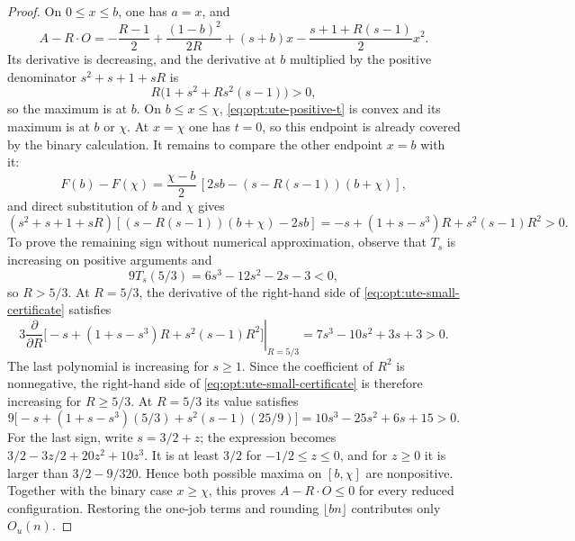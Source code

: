 \begin{proof}
On $0\le x\le b$, one has $a=x$, and
\begin{equation}
 A-R\cdot O=-\frac{R-1}{2}+\frac{(1-b)^2}{2R}+(s+b)x
 -\frac{s+1+R(s-1)}2x^2.
 \label{eq:opt:ute-small-x}
\end{equation}
Its derivative is decreasing, and the derivative at $b$ multiplied by the
positive denominator $s^2+s+1+sR$ is
\begin{equation}
 R\bigl(1+s^2+R s^2(s-1)\bigr)>0,
\end{equation}
so the maximum is at $b$.  On $b\le x\le\chi$,
\cref{eq:opt:ute-positive-t} is convex and its maximum is at $b$ or $\chi$.
At $x=\chi$ one has $t=0$, so this endpoint is already covered by the binary
calculation.  It remains to compare the other endpoint $x=b$ with it:
\begin{equation}
 F(b)-F(\chi)
 =\frac{\chi-b}{2}\,[2sb-(s-R(s-1))(b+\chi)],
\end{equation}
and direct substitution of $b$ and $\chi$ gives
\begin{equation}
 (s^2+s+1+sR)[(s-R(s-1))(b+\chi)-2sb]
 =-s+(1+s-s^3)R+s^2(s-1)R^2>0.
 \label{eq:opt:ute-small-certificate}
\end{equation}
To prove the remaining sign without numerical approximation, observe that
$T_s$ is increasing on positive arguments and
\begin{equation}
 9T_s(5/3)=6s^3-12s^2-2s-3<0,
\end{equation}
so $R>5/3$.  At $R=5/3$, the derivative of the right-hand side of
\cref{eq:opt:ute-small-certificate} satisfies
\begin{equation}
 3\left.\frac{\partial}{\partial R}
 \bigl[-s+(1+s-s^3)R+s^2(s-1)R^2\bigr]\right|_{R=5/3}
 =7s^3-10s^2+3s+3>0.
\end{equation}
The last polynomial is increasing for $s\ge1$.  Since the coefficient of
$R^2$ is nonnegative, the right-hand side of
\cref{eq:opt:ute-small-certificate} is therefore increasing for
$R\ge5/3$.  At $R=5/3$ its value satisfies
\begin{equation}
 9\bigl[-s+(1+s-s^3)(5/3)+s^2(s-1)(25/9)\bigr]
 =10s^3-25s^2+6s+15>0.
\end{equation}
For the last sign, write $s=3/2+z$; the expression becomes
$3/2-3z/2+20z^2+10z^3$.  It is at least $3/2$ for
$-1/2\le z\le0$, and for $z\ge0$ it is larger than
$3/2-9/320$.  Hence both possible maxima on $[b,\chi]$ are nonpositive.
Together with the binary case $x\ge\chi$, this proves $A-R\cdot O\le0$ for every
reduced configuration.  Restoring the one-job terms and rounding
$\lfloor bn\rfloor$ contributes only $O_u(n)$.
\end{proof}

